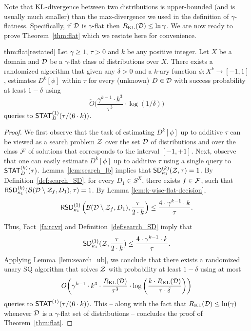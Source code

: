 Note that ${\mathrm{KL}}$-divergence between two distributions is upper-bounded (and is usually much smaller) than the max-divergence we used in the definition of $\gamma$-flatness. Specifically, if $\mathcal{D}$ is $\gamma$-flat  then $R_{\mathrm{KL}}(\mathcal{D}) \leq \ln \gamma$.
We are now ready to prove Theorem~\ref{thm:flat} which we restate here for convenience.
\begin{reptheorem}{thm:flat}[restated]
Let $\gamma \geq 1$, $\tau > 0$ and $k$ be any positive integer. Let $X$ be a domain and $\mathcal{D}$ be a $\gamma$-flat class of distributions over $X$. There exists a randomized algorithm that given any $\delta > 0$ and a $k$-ary function $\phi: X^k \to [-1,1]$, estimates $D^k[\phi]$ within $\tau$  for every (unknown) $D \in \mathcal{D}$ with success probability at least $1-\delta$ using $$\tilde{O}\bigg( \frac{\gamma^{k-1} \cdot k^3}{\tau^3} \cdot \log (1/\delta)\bigg)$$
queries to $\mathsf{STAT}_D^{(1)}(\tau/(6 \cdot k))$.\end{reptheorem}
\begin{proof}
We first observe that the task of estimating $D^k[\phi]$ up to additive $\tau$ can be viewed as a search problem $\mathcal{Z}$ over the set $\mathcal{D}$ of distributions and over the class $\mathcal{F}$ of solutions that corresponds to the interval $[-1,+1]$. Next, observe that one can easily estimate $D^k[\phi]$ up to additive $\tau$ using a single query to $\mathsf{STAT}^{(k)}_D(\tau)$. Lemma~\ref{lem:search_lb} implies that $\mathsf{SD}^{(k)}_{\kappa_1}(\mathcal{Z},\tau) = 1$. By Definition~\ref{def:search_SD}, for every $D_1 \in S^X$, there exists $f \in \mathcal{F}$, such that $\mathsf{RSD}^{(k)}_{\kappa_1}(\mathcal{B}(\mathcal{D} \setminus \mathcal{Z}_f, D_1), \tau) = 1$. By Lemma \ref{lem:k-wise-flat-decision},
 $$\mathsf{RSD}_{\kappa_1}^{(1)}\left(\mathcal{B}(\mathcal{D} \setminus \mathcal{Z}_f, D_1),\frac{\tau}{2 \cdot k}\right) \le \frac{4 \cdot \gamma^{k-1} \cdot k}{\tau}.$$

Thus, Fact~\ref{fa:rcvr} and Definition~\ref{def:search_SD} imply that
$$ \mathsf{SD}_{\kappa_1}^{(1)}(\mathcal{Z},\frac{\tau}{2 \cdot k}) \le \frac{4 \cdot \gamma^{k-1} \cdot k}{\tau}.$$
Applying Lemma~\ref{lem:search_ub}, we conclude that there exists a randomized unary SQ algorithm that solves $\mathcal{Z}$ with probability at least $1-\delta$ using at most $$O\bigg(\gamma^{k-1} \cdot k^3 \cdot \frac{R_{\mathrm{KL}}(\mathcal{D})}{\tau^3} \cdot \log\bigg( \frac{k \cdot R_{\mathrm{KL}}(\mathcal{D})}{\tau \cdot \delta}\bigg)\bigg)$$
queries to $\mathsf{STAT}^{(1)}(\tau/(6 \cdot k))$. This -- along with the fact that $R_{\mathrm{KL}}(\mathcal{D}) \le \ln(\gamma)$ whenever $\mathcal{D}$ is a $\gamma$-flat set of distributions -- concludes the proof of Theorem~\ref{thm:flat}.
\end{proof}

